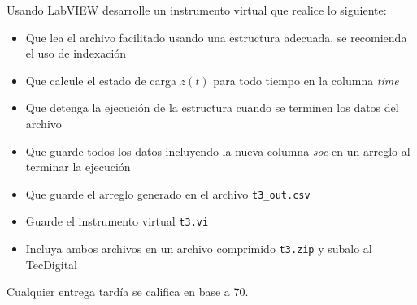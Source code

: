 \documentclass[12pt]{article}
\begin{document}
Usando LabVIEW desarrolle un instrumento virtual que realice lo siguiente:

\begin{itemize}
    \item Que lea el archivo facilitado usando una estructura adecuada, se recomienda el uso de indexación
    \item Que calcule el estado de carga $z(t)$ para todo tiempo en la columna \emph{time}
    \item Que detenga la ejecución de la estructura cuando se terminen los datos del archivo
    \item Que guarde todos los datos incluyendo la nueva columna \emph{soc} en un arreglo al terminar la ejecución
    \item Que guarde el arreglo generado en el archivo \verb+t3_out.csv+
    \item Guarde el instrumento virtual \verb+t3.vi+
    \item Incluya ambos archivos en un archivo comprimido \verb+t3.zip+ y subalo al TecDigital
\end{itemize}

Cualquier entrega tardía se califica en base a 70. 


% 
% 
\end{document}
